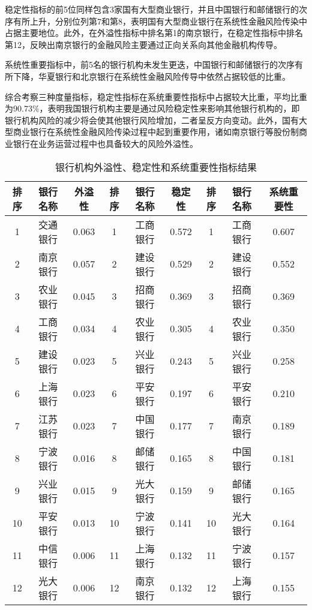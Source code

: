 \documentclass[lang=cn]{elegantpaper}
\begin{document}
稳定性指标的前5位同样包含3家国有大型商业银行，并且中国银行和邮储银行的次序有所上升，分别位列第7和第8，表明国有大型商业银行在系统性金融风险传染中占据主要地位。此外，在外溢性指标中排名第1的南京银行，在稳定性指标中排名第12，反映出南京银行的金融风险主要通过正向关系向其他金融机构传导。

系统性重要指标中，前5名的银行机构未发生更迭，中国银行和邮储银行的次序有所下降，华夏银行和北京银行在系统性金融风险传导中依然占据较低的比重。

综合考察三种度量指标，稳定性指标在系统重要性指标中占据较大比重，平均比重为90.73\%，表明我国银行机构主要是通过风险稳定性来影响其他银行机构的，即银行机构风险的减少将会使其他银行风险增加，二者呈反方向变动。此外，国有大型商业银行在系统性金融风险传染过程中起到重要作用，诸如南京银行等股份制商业银行在业务运营过程中也具备较大的风险外溢性。
\begin{table}[htb]
    \centering
    \caption{银行机构外溢性、稳定性和系统重要性指标结果}
    \label{表8}
    \begin{tabular*}{\textwidth}{@{}@{\extracolsep{\fill}}ccccccccc@{}}
    \toprule
    排序 & 银行名称 & 外溢性   & 排序 & 银行名称 & 稳定性   & 排序 & 银行名称 & 系统重要性 \\ \midrule
    1  & 交通银行 & 0.063 & 1  & 工商银行 & 0.572 & 1  & 工商银行 & 0.607 \\
    2  & 南京银行 & 0.057 & 2  & 建设银行 & 0.529 & 2  & 建设银行 & 0.552 \\
    3  & 农业银行 & 0.045 & 3  & 招商银行 & 0.369 & 3  & 招商银行 & 0.369 \\
    4  & 工商银行 & 0.034 & 4  & 农业银行 & 0.305 & 4  & 农业银行 & 0.350 \\
    5  & 建设银行 & 0.023 & 5  & 兴业银行 & 0.243 & 5  & 兴业银行 & 0.258 \\
    6  & 上海银行 & 0.023 & 6  & 平安银行 & 0.197 & 6  & 平安银行 & 0.210 \\
    7  & 江苏银行 & 0.023 & 7  & 中国银行 & 0.177 & 7  & 南京银行 & 0.189 \\
    8  & 宁波银行 & 0.016 & 8  & 邮储银行 & 0.165 & 8  & 中国银行 & 0.181 \\
    9  & 兴业银行 & 0.015 & 9  & 光大银行 & 0.159 & 9  & 邮储银行 & 0.165 \\
    10 & 平安银行 & 0.013 & 10 & 宁波银行 & 0.141 & 10 & 光大银行 & 0.164 \\
    11 & 中信银行 & 0.006 & 11 & 上海银行 & 0.132 & 11 & 宁波银行 & 0.157 \\
    12 & 光大银行 & 0.006 & 12 & 南京银行 & 0.132 & 12 & 上海银行 & 0.155 \\

\end{tabular*}
\end{table}
\end{document}
